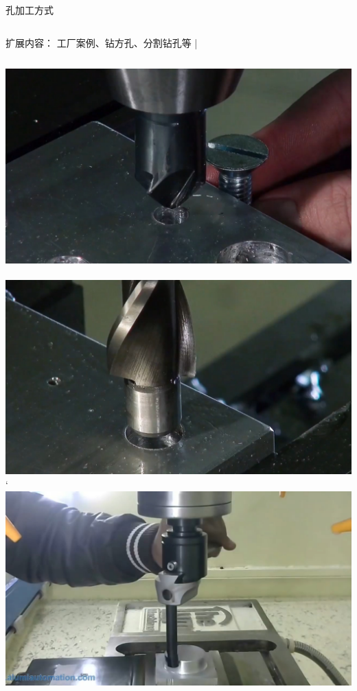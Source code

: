 \documentclass[utf8,zihao=-4,handout,smaller,aspectratio=1610]{ctexbeamer}
\begin{document}
\begin{frame}{孔加工方式}
	\begin{columns}
		\begin{block}{扩展内容：}
			工厂案例、钻方孔、分割钻孔等
			|\end{block}
	\end{columns}
	
	\vspace{25pt}
	
	\includegraphics[width=0.3\linewidth,trim=0 0 0 0,clip,angle=0]{image/zhuikong.jpg}~
	\includegraphics[width=0.3\linewidth,trim=0 0 0 0,clip,angle=0]{image/fukong.jpg}`
	\includegraphics[width=0.3\linewidth,trim=0 0 0 0,clip,angle=0]{image/tangwaixing.jpg}
	
\end{frame}
\end{document}
